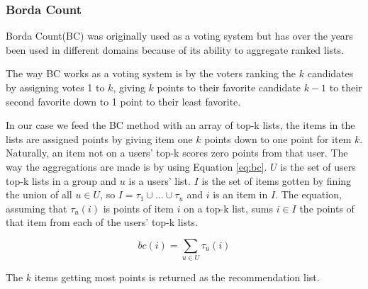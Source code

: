 \subsubsection{Borda Count}\label{sec:bordacount}
Borda Count(BC) was originally used as a voting system but has over the years been used in different domains because of its ability to aggregate ranked lists\cite{Baltrunas:2010:GRR:1864708.1864733, Masthoff2004}.

The way BC works as a voting system is by the voters ranking the $k$ candidates by assigning votes 1 to $k$, giving $k$ points to their favorite candidate $k-1$ to their second favorite down to 1 point to their least favorite.

In our case we feed the BC method with an array of top-k lists, the items in the lists are assigned points by giving item one $k$ points down to one point for item $k$\cite{ourreport}.  Naturally, an item not on a users' top-k scores zero points from that user. The way the aggregations are made is by using Equation \ref{eq:bc}. $U$ is the set of users top-k lists in a group and $u$ is a users' list. $I$ is the set of items gotten by fining the union of all $u\in U$, so $I = \tau_1 \cup ... \cup \tau_u$ and $i$ is an item in $I$. The equation, assuming that $\tau_u(i)$ is points of item $i$ on a top-k list, sums $i\in I$ the points of that item from each of the users' top-k lists.


\begin{equation}\label{eq:bc}
bc(i) = \sum_{u\in U} \tau_u(i)
\end{equation}

The $k$ items getting most points is returned as the recommendation list.